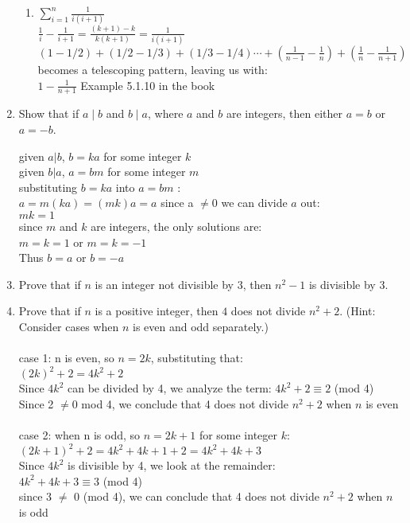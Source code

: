 \documentclass{article}
\begin{document}
\begin{enumerate}
\begin{enumerate}
			\item $\sum_{i=1}^{n} \frac{1}{i(i+1)}$ \\ 
			 $ \frac{1}{i} - \frac{1}{i+1}  = \frac{(k+1)-k}{k(k+1)}=\frac{1}{i(i+1)} $ \\
			 
			 $(1 - 1/2)+ (1/2 - 1/3) +  (1/3 - 1/4) \cdots + (\frac{1}{n-1} - \frac{1}{n}) + (\frac{1}{n} - \frac{1}{n+1})$
			  becomes a telescoping pattern, leaving us with: \\ 
			 $1 - \frac{1}{n+1}$ Example 5.1.10 in the book
			 
		\end{enumerate}
		
		\item Show that if $a \mid b$ and $b \mid a$, where $a$ and $b$ are integers, then either $a = b$ or $a = -b$.
		
		given $a|b$, $b = ka$ for some integer $k$ \\ 
		given $b|a$, $a = bm$ for some integer $m$ \\
		substituting $b=ka$ into $a=bm$ :\\ 
		$a = m(ka) = (mk)a = a$  since a $\not= 0$ we can divide $a$ out:\\
		$mk=1$ \\ 
		since  $m$ and $k$ are integers, the only solutions are: \\
		$m=k=1$ or $m=k=-1$\\
		Thus $b=a$ or $b=-a$
		
		\item Prove that if $n$ is an integer not divisible by $3$, then $n^2 - 1$ is divisible by $3$.
		
		
		\item Prove that if $n$ is a positive integer, then $4$ does not divide $n^2 + 2$. (Hint: Consider cases when $n$ is even and odd separately.)
		 \\ \\ 
		case 1: n is even, so $n = 2k$, substituting that: \\ 
		$(2k)^2 + 2 = 4k^2 +2$ \\ 
		Since $4k^2$ can be divided by 4, we analyze the term: $4k^2 +2 \equiv 2$ (mod 4) \\ Since 2 $\not=0$ mod 4, we conclude that 4  does not divide $n^2 + 2$ when $n$ is even
		\\ \\
		case 2: when n is odd, so $n=2k+1 $ for some integer $k$: \\
		$(2k+1)^2 +2  = 4k^2 +4k + 1 + 2 = 4k^2 + 4k +3$ \\
		Since $4k^2$ is divisible by 4, we look at the remainder: \\
		$4k^2 + 4k + 3 \equiv 3$ (mod 4) \\ 
		since 3 $\not=$ 0 (mod 4), we can conclude that 4 does not divide $n^2 + 2$ when $n$ is odd

		
	\end{enumerate}
	
\end{document}
